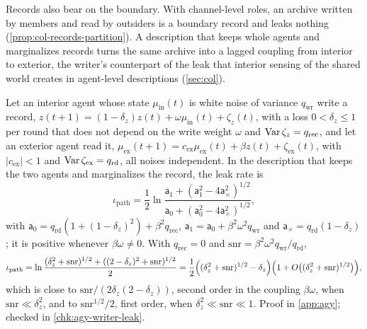 Records also bear on the boundary. With channel-level roles, an archive written by members and read by outsiders is a boundary record and leaks nothing (\cref{prop:col-records-partition}). A description that keeps whole agents and marginalizes records turns the same archive into a lagged coupling from interior to exterior, the writer's counterpart of the leak that interior sensing of the shared world creates in agent-level descriptions (\cref{sec:col}).

\begin{proposition}\label{prop:agy-writer-leak}
Let an interior agent whose state $\mu_{\mathrm{in}}(t)$ is white noise of variance $q_{\mathrm{wr}}$ write a record, $z(t+1)=(1-\delta_z)z(t)+\omega\mu_{\mathrm{in}}(t)+\zeta_z(t)$, with a loss $0<\delta_z\le1$ per round that does not depend on the write weight $\omega$ and $\operatorname{Var}\zeta_z=q_{\mathrm{rec}}$, and let an exterior agent read it, $\mu_{\mathrm{ex}}(t+1)=c_{\mathrm{ex}}\mu_{\mathrm{ex}}(t)+\beta z(t)+\zeta_{\mathrm{ex}}(t)$, with $\lvert c_{\mathrm{ex}}\rvert<1$ and $\operatorname{Var}\zeta_{\mathrm{ex}}=q_{\mathrm{rd}}$, all noises independent. In the description that keeps the two agents and marginalizes the record, the leak rate is
\begin{equation}\label{eq:agy-writer-leak}
\iota_{\mathrm{path}}=\frac12\ln\frac{\mathsf a_1+(\mathsf a_1^2-4\mathsf a_\times^2)^{1/2}}{\mathsf a_0+(\mathsf a_0^2-4\mathsf a_\times^2)^{1/2}},
\end{equation}
with $\mathsf a_0=q_{\mathrm{rd}}(1+(1-\delta_z)^2)+\beta^2q_{\mathrm{rec}}$, $\mathsf a_1=\mathsf a_0+\beta^2\omega^2q_{\mathrm{wr}}$ and $\mathsf a_\times=q_{\mathrm{rd}}(1-\delta_z)$; it is positive whenever $\beta\omega\ne0$. With $q_{\mathrm{rec}}=0$ and $\mathrm{snr}=\beta^2\omega^2q_{\mathrm{wr}}/q_{\mathrm{rd}}$,
\begin{equation}\label{eq:agy-writer-regimes}
\iota_{\mathrm{path}}=\ln\frac{(\delta_z^2+\mathrm{snr})^{1/2}+((2-\delta_z)^2+\mathrm{snr})^{1/2}}2=\frac12\Bigl((\delta_z^2+\mathrm{snr})^{1/2}-\delta_z\Bigr)\Bigl(1+O\bigl((\delta_z^2+\mathrm{snr})^{1/2}\bigr)\Bigr),
\end{equation}
which is close to $\mathrm{snr}/(2\delta_z(2-\delta_z))$, second order in the coupling $\beta\omega$, when $\mathrm{snr}\ll\delta_z^2$, and to $\mathrm{snr}^{1/2}/2$, first order, when $\delta_z^2\ll\mathrm{snr}\ll1$. Proof in \cref{app:agy}; checked in \cref{chk:agy-writer-leak}.
\end{proposition}

